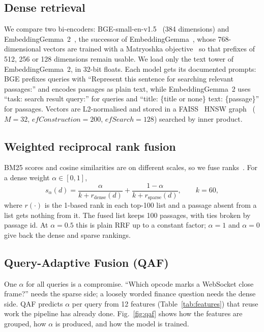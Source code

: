 \subsection{Dense retrieval}
We compare two bi-encoders: BGE-small-en-v1.5~\cite{xiao2024cpack,baai2023bgesmall}
(384 dimensions) and EmbeddingGemma~2~\cite{vera2026embeddinggemma2}, the
successor of EmbeddingGemma~\cite{vera2025embeddinggemma}, whose 768-dimensional
vectors are trained with a Matryoshka objective~\cite{kusupati2022matryoshka}
so that prefixes of 512, 256 or 128 dimensions remain usable. We load only the
text tower of EmbeddingGemma~2, in 32-bit floats. Each model gets its
documented prompts: BGE prefixes queries with ``Represent this sentence for
searching relevant passages:'' and encodes passages as plain text, while
EmbeddingGemma~2 uses ``task: search result \textbar{} query:'' for queries
and ``title: \{title or none\} \textbar{} text: \{passage\}'' for passages.
Vectors are L2-normalised and stored in a FAISS~\cite{johnson2021faiss} HNSW
graph~\cite{malkov2020hnsw} ($M=32$, $\mathit{efConstruction}=200$,
$\mathit{efSearch}=128$) searched by inner product.

\subsection{Weighted reciprocal rank fusion}
BM25 scores and cosine similarities are on different scales, so we fuse
ranks~\cite{cormack2009rrf}. For a dense weight $\alpha\in[0,1]$,
\begin{equation}
  s_{\alpha}(d)=\frac{\alpha}{k+r_{\mathrm{dense}}(d)}
               +\frac{1-\alpha}{k+r_{\mathrm{sparse}}(d)},\qquad k=60,
  \label{eq:rrf}
\end{equation}
where $r(\cdot)$ is the 1-based rank in each top-100 list and a passage absent
from a list gets nothing from it. The fused list keeps 100 passages, with ties
broken by passage id. At $\alpha=0.5$ this is plain RRF up to a constant
factor; $\alpha=1$ and $\alpha=0$ give back the dense and sparse rankings.

\subsection{Query-Adaptive Fusion (QAF)}
\label{sec:qaf}
One $\alpha$ for all queries is a compromise. ``Which opcode marks a WebSocket
close frame?'' needs the sparse side; a loosely worded finance question needs
the dense side. QAF predicts $\alpha$ per query from 12 features
(Table~\ref{tab:features}) that reuse work the pipeline has already done.
Fig.~\ref{fig:qaf} shows how the features are grouped, how $\alpha$ is
produced, and how the model is trained.

